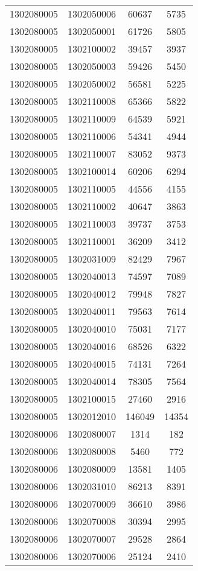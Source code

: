 \begin{longtable}[h]{llcc}
		1302080005 & 1302050006 & 60637 & 5735\\
		1302080005 & 1302050001 & 61726 & 5805\\
		1302080005 & 1302100002 & 39457 & 3937\\
		1302080005 & 1302050003 & 59426 & 5450\\
		1302080005 & 1302050002 & 56581 & 5225\\
		1302080005 & 1302110008 & 65366 & 5822\\
		1302080005 & 1302110009 & 64539 & 5921\\
		1302080005 & 1302110006 & 54341 & 4944\\
		1302080005 & 1302110007 & 83052 & 9373\\
		1302080005 & 1302100014 & 60206 & 6294\\
		1302080005 & 1302110005 & 44556 & 4155\\
		1302080005 & 1302110002 & 40647 & 3863\\
		1302080005 & 1302110003 & 39737 & 3753\\
		1302080005 & 1302110001 & 36209 & 3412\\
		1302080005 & 1302031009 & 82429 & 7967\\
		1302080005 & 1302040013 & 74597 & 7089\\
		1302080005 & 1302040012 & 79948 & 7827\\
		1302080005 & 1302040011 & 79563 & 7614\\
		1302080005 & 1302040010 & 75031 & 7177\\
		1302080005 & 1302040016 & 68526 & 6322\\
		1302080005 & 1302040015 & 74131 & 7264\\
		1302080005 & 1302040014 & 78305 & 7564\\
		1302080005 & 1302100015 & 27460 & 2916\\
		1302080005 & 1302012010 & 146049 & 14354\\
		1302080006 & 1302080007 & 1314 & 182\\
		1302080006 & 1302080008 & 5460 & 772\\
		1302080006 & 1302080009 & 13581 & 1405\\
		1302080006 & 1302031010 & 86213 & 8391\\
		1302080006 & 1302070009 & 36610 & 3986\\
		1302080006 & 1302070008 & 30394 & 2995\\
		1302080006 & 1302070007 & 29528 & 2864\\
		1302080006 & 1302070006 & 25124 & 2410\\

\end{longtable}
